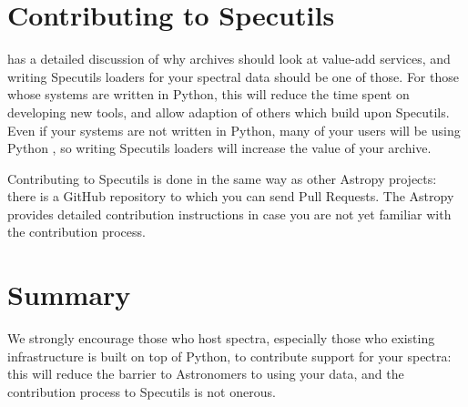 \documentclass[11pt,twoside]{article}
\begin{document}
\section{Contributing to Specutils}

\citet{C23_adassxxxii} has a detailed discussion of why archives should look at
value-add services, and writing Specutils loaders for your spectral data should
be one of those.  For those whose systems are written in Python, this will
reduce the time spent on developing new tools, and allow adaption of others
which build upon Specutils. Even if your systems are not written in Python, many
of your users will be using Python \citep{2015arXiv150703989M},
so writing Specutils loaders will increase the value of your archive.

Contributing to Specutils is done in the same way as other Astropy projects:
there is a GitHub repository to which you can send Pull Requests. The Astropy
provides detailed contribution instructions in case you are not yet familiar
with the contribution process.


\section{Summary}

We strongly encourage those who host spectra, especially those who existing
infrastructure is built on top of Python, to contribute support for your
spectra: this will reduce the barrier to Astronomers to using your data, and the
contribution process to Specutils is not onerous.




\end{document}
